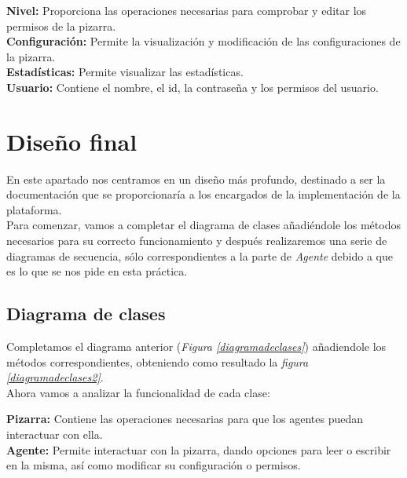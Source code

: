 \textbf{Nivel: }Proporciona las operaciones necesarias para comprobar y editar los permisos de la pizarra.\\

\textbf{Configuración: }Permite la visualización y modificación de las configuraciones de la pizarra.\\

\textbf{Estadísticas: }Permite visualizar las estadísticas.\\

\textbf{Usuario:} Contiene el nombre, el id, la contraseña y los permisos del usuario.


\begin{sidewaysfigure}
\centering
\clasesanalisis
\caption{Diagrama de clases}
\label{diagramadeclases}
\end{sidewaysfigure}
\newpage


\section{Diseño final}
En este apartado nos centramos en un diseño más profundo, destinado a ser la documentación que se proporcionaría a los encargados de la implementación de la plataforma.\\

Para comenzar, vamos a completar el diagrama de clases añadiéndole los métodos necesarios para su correcto funcionamiento y después realizaremos una serie de diagramas de secuencia, sólo correspondientes a la parte de \emph{Agente} debido a que es lo que se nos pide en esta práctica.

\subsection{Diagrama de clases}
Completamos el diagrama anterior (\emph{Figura \ref{diagramadeclases}}) añadiendole los métodos correspondientes, obteniendo como resultado la \emph{figura \ref{diagramadeclases2}}.\\

Ahora vamos a analizar la funcionalidad de cada clase:

\textbf{Pizarra:} Contiene las operaciones necesarias para que los agentes puedan interactuar con ella.\\

\textbf{Agente:} Permite interactuar con la pizarra, dando opciones para leer o escribir en la misma, así como modificar su configuración o permisos.\\

